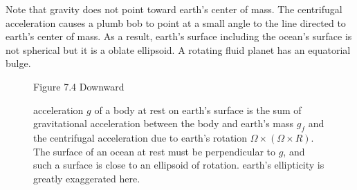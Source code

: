Note that gravity does not point toward earth's center of mass. The
centrifugal acceleration causes a plumb bob to point at a small angle
to the line directed to earth's center of mass. As a result, earth's
surface including the ocean's surface is not spherical but it is a
oblate ellipsoid. A rotating fluid planet has an equatorial bulge.
\begin{figure}[h!]
\footnotesize
Figure 7.4 Downward \rule{0mm}{4ex}acceleration $g$ of a body at rest
on earth's surface is the sum of gravitational acceleration between
the body and earth's mass $g_f$ and the centrifugal acceleration due
to earth's rotation $\Omega\times(\Omega\times{R})$. The surface of an
ocean at rest must be perpendicular to $g$, and such a surface is
close to an ellipsoid of rotation. earth's ellipticity is greatly
exaggerated here.
\label{fig:gravitysketch}
\vspace{-2ex}
\end{figure}

